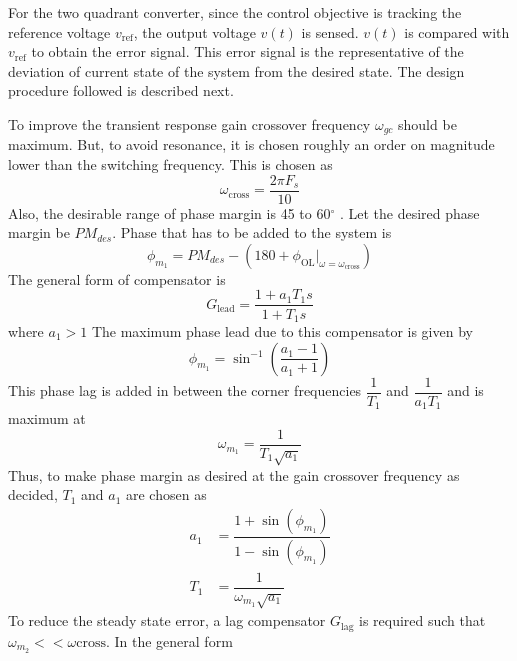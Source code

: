 	For the two quadrant converter, since the control objective is tracking the reference voltage $v_{\text{ref}}$, the output voltage $v(t)$ is sensed. $v(t)$ is compared with $v_{\text{ref}}$ to obtain the error signal. This error signal is the representative of the deviation of current state of the system from the desired state. The design procedure followed is described next.

	To improve the transient response gain crossover frequency $\omega_{gc}$ should be maximum. But, to avoid resonance, it is chosen roughly an order on magnitude lower than the switching frequency. This is chosen as
	\begin{equation}
		\omega_{\text{cross}} = \dfrac{2 \pi F_s}{10}
		\label{eq:50}
	\end{equation}
    Also, the desirable range of phase margin is 45 to 60$^\circ$ \cite{book:768263}. Let the desired phase margin be $PM_{des}$.
    Phase that has to be added to the system is 
    \begin{equation}
    \phi_{m_1} = PM_{des} -\left(180 + \phi_{\text{OL}}\Bigr|_{\omega = \omega_{\text{cross}}}\right)
	\label{eq:50a}    
    \end{equation}
    The general form of compensator is 
    \begin{equation}
    	G_{\text{lead}} = \dfrac{1+a_1T_1s}{1+T_1s}
	    \label{eq:51}    
    \end{equation}
    where $a_1>1$
    The maximum phase lead due to this compensator is given by
    \begin{equation}
    	\phi_{m_1} = \sin^{-1}\left(\dfrac{a_1-1}{a_1+1}\right)
	    \label{eq:52}    
    \end{equation}
    This phase lag is added in between the corner frequencies $\dfrac{1}{T_1}$ and $\dfrac{1}{a_1T_1}$ and is maximum at
    \begin{equation}
    	\omega_{m_1} = \dfrac{1}{T_1\sqrt{a_1}}
	    \label{eq:53}    
    \end{equation}
    Thus, to make phase margin as desired at the gain crossover frequency as decided, $T_1$ and $a_1$ are chosen as
    \begin{equation}
		\begin{split}
			a_1 &= \dfrac{1+\sin(\phi_{m_1})}{1-\sin(\phi_{m_1})}\\
			T_1 &= \dfrac{1}{\omega_{m_1}\sqrt{a_1}}		
		\end{split}
		\label{eq:54}    
    \end{equation}
    To reduce the steady state error, a lag compensator $G_{\text{lag}}$ is required such that $\omega_{m_2} << \omega{\text{cross}}$. In the general form

